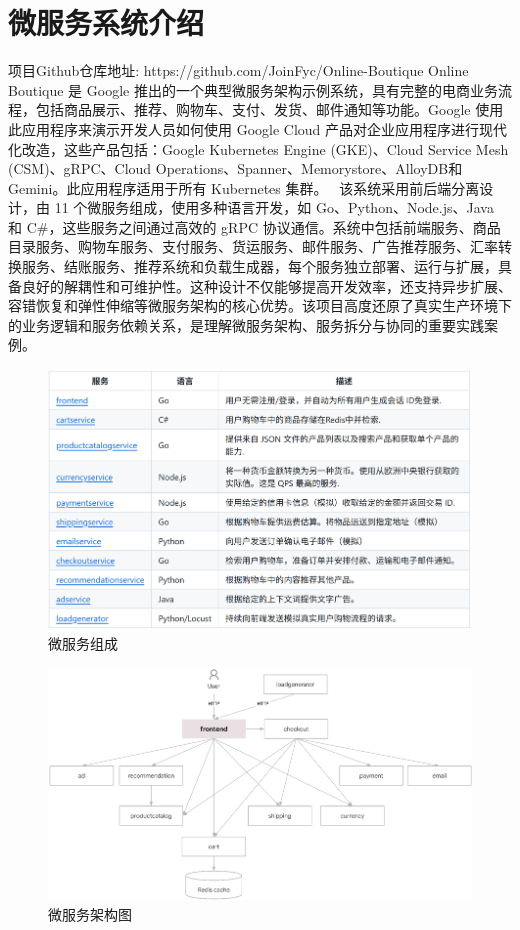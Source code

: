 \documentclass[hyperref,a4paper,UTF8]{ctexart}
\begin{document}
\section{微服务系统介绍}
项目Github仓库地址: https://github.com/JoinFyc/Online-Boutique
Online Boutique 是 Google 推出的一个典型微服务架构示例系统，具有完整的电商业务流程，包括商品展示、推荐、购物车、支付、发货、邮件通知等功能。Google 使用此应用程序来演示开发人员如何使用 Google Cloud 产品对企业应用程序进行现代化改造，这些产品包括：Google Kubernetes Engine (GKE)、Cloud Service Mesh (CSM)、gRPC、Cloud Operations、Spanner、Memorystore、AlloyDB和Gemini。此应用程序适用于所有 Kubernetes 集群。
\
该系统采用前后端分离设计，由 11 个微服务组成，使用多种语言开发，如 Go、Python、Node.js、Java 和 C#，这些服务之间通过高效的 gRPC 协议通信。系统中包括前端服务、商品目录服务、购物车服务、支付服务、货运服务、邮件服务、广告推荐服务、汇率转换服务、结账服务、推荐系统和负载生成器，每个服务独立部署、运行与扩展，具备良好的解耦性和可维护性。这种设计不仅能够提高开发效率，还支持异步扩展、容错恢复和弹性伸缩等微服务架构的核心优势。该项目高度还原了真实生产环境下的业务逻辑和服务依赖关系，是理解微服务架构、服务拆分与协同的重要实践案例。

\begin{figure}[H]
    \centering
    \includegraphics[width=0.75\linewidth]{微服务组成.png}
    \caption{微服务组成}
    \label{fig:enter-label}
\end{figure}
\begin{figure}[H]
    \centering
    \includegraphics[width=1\linewidth]{微服务架构图.png}
    \caption{微服务架构图}
    \label{fig:enter-label}
\end{figure}
\end{document}
